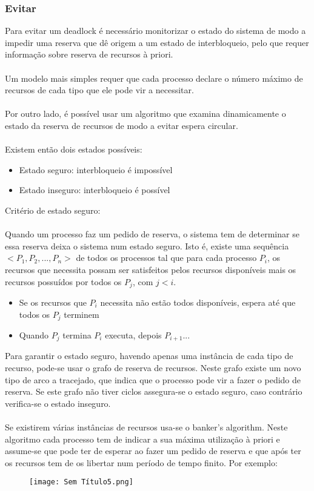 \documentclass[10pt,a4paper]{report}
\begin{document}
\subsubsection{Evitar}
Para evitar um deadlock é necessário monitorizar o estado do sistema de modo a impedir uma reserva que dê origem a um estado de interbloqueio, pelo que requer informação sobre reserva de recursos à priori.\\
\\
Um modelo mais simples requer que cada processo declare o número máximo de recursos de cada tipo que ele pode vir a necessitar.\\
\\
Por outro lado, é possível usar um algoritmo que examina dinamicamente o estado da reserva de recursos de modo a evitar espera circular.\\
\\
Existem então dois estados possíveis:
\begin{itemize}
\item Estado seguro: interbloqueio é impossível
\item Estado inseguro: interbloqueio é possível
\end{itemize}
Critério de estado seguro:\\
\\
Quando um processo faz um pedido de reserva, o sistema tem de determinar se essa reserva deixa o sistema num estado seguro. Isto é, existe uma sequência $<P_1, P_2, ..., P_n>$ de todos os processos tal que para cada processo $P_i$, os recursos que necessita possam ser satisfeitos pelos recursos disponíveis mais os recursos possuídos por todos os $P_j$, com $j < i$.
\begin{itemize}
\item Se os recursos que $P_i$ necessita não estão todos disponíveis, espera até que todos os $P_j$ terminem
\item Quando $P_j$ termina $P_i$ executa, depois $P_{i+1}$...
\end{itemize}
Para garantir o estado seguro, havendo apenas uma instância de cada tipo de recurso, pode-se usar o grafo de reserva de recursos. Neste grafo existe um novo tipo de arco a tracejado, que indica que o processo pode vir a fazer o pedido de reserva. Se este grafo não tiver ciclos assegura-se o estado seguro, caso contrário verifica-se o estado inseguro.\\
\\
Se existirem várias instâncias de recursos usa-se o banker's algorithm. Neste algoritmo cada processo tem de indicar a sua máxima utilização à priori e assume-se que pode ter de esperar ao fazer um pedido de reserva e que após ter os recursos tem de os libertar num período de tempo finito. Por exemplo:
\begin{figure}[H]
\centering
\texttt{[image: Sem Título5.png]}
\end{figure}
\end{document}
